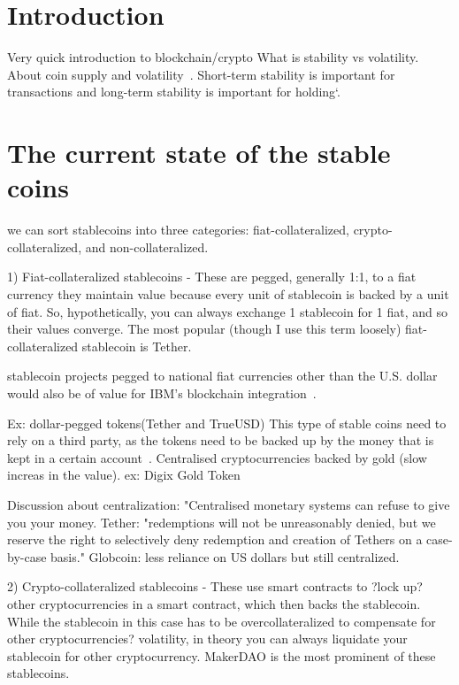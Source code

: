 \section{Introduction}
Very quick introduction to blockchain/crypto
What is stability vs volatility.
About coin supply and volatility~\cite{sams2015note}.
Short-term stability is important for transactions and long-term stability is important for holding`\cite{forbes}.


\section{The current state of the stable coins} %


we can sort stablecoins into three categories: fiat-collateralized, crypto-collateralized, and non-collateralized.

1) Fiat-collateralized stablecoins - These are pegged, generally 1:1, to a fiat currency they maintain value because every unit of stablecoin is backed by a unit of fiat. So, hypothetically, you can always exchange 1 stablecoin for 1 fiat, and so their values converge. The most popular (though I use this term loosely) fiat-collateralized stablecoin is Tether.

stablecoin projects pegged to national fiat currencies other than the U.S. dollar would also be of value for IBM’s blockchain integration~\cite{cointelegraph}.

Ex: dollar-pegged tokens(Tether and TrueUSD)
This type of stable coins need to rely on a third party, as the tokens need to be backed up by the money that is kept in a certain account~\cite{techrev}. Centralised cryptocurrencies backed by gold (slow increas in the value). ex: Digix Gold Token

Discussion about centralization: "Centralised monetary systems can refuse to give you your money. Tether: "redemptions will not be unreasonably denied, but we reserve the right to selectively deny redemption and creation of Tethers on a case-by-case basis." Globcoin: less reliance on US dollars but still centralized.~\cite{cryptoinsider}

2) Crypto-collateralized stablecoins - These use smart contracts to ?lock up? other cryptocurrencies in a smart contract, which then backs the stablecoin. While the stablecoin in this case has to be overcollateralized to compensate for other cryptocurrencies? volatility, in theory you can always liquidate your stablecoin for other cryptocurrency. MakerDAO is the most prominent of these stablecoins.

